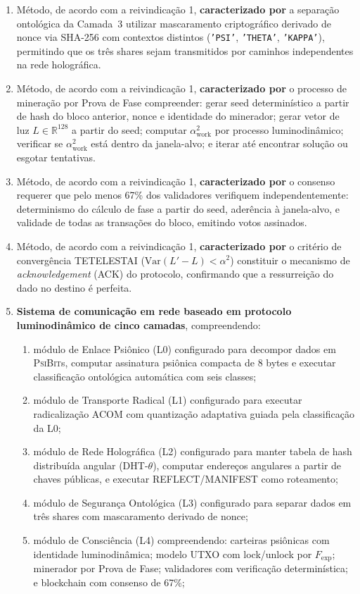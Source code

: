 \documentclass[12pt,a4paper]{article}
\newcommand{\alphaii}{\alpha^2}
\newcommand{\Fexp}{F_{\text{exp}}}
\newcommand{\PsiBit}{\textsc{PsiBit}}
\begin{document}
\begin{enumerate}
\item Método, de acordo com a reivindicação 1,
\textbf{caracterizado por} a separação ontológica da Camada~3
utilizar mascaramento criptográfico derivado de nonce via
SHA-256 com contextos distintos (\texttt{'PSI'}, \texttt{'THETA'},
\texttt{'KAPPA'}), permitindo que os três shares sejam
transmitidos por caminhos independentes na rede holográfica.

\item Método, de acordo com a reivindicação 1,
\textbf{caracterizado por} o processo de mineração por Prova
de Fase compreender: gerar seed determinístico a partir de
hash do bloco anterior, nonce e identidade do minerador;
gerar vetor de luz $L \in \mathbb{R}^{128}$ a partir do seed;
computar $\alphaii_{\text{work}}$ por processo luminodinâmico;
verificar se $\alphaii_{\text{work}}$ está dentro da
janela-alvo; e iterar até encontrar solução ou esgotar
tentativas.

\item Método, de acordo com a reivindicação 1,
\textbf{caracterizado por} o consenso requerer que pelo menos
67\% dos validadores verifiquem independentemente:
determinismo do cálculo de fase a partir do seed, aderência
à janela-alvo, e validade de todas as transações do bloco,
emitindo votos assinados.

\item Método, de acordo com a reivindicação 1,
\textbf{caracterizado por} o critério de convergência
TETELESTAI ($\text{Var}(L' - L) < \alphaii$) constituir
o mecanismo de \textit{acknowledgement} (ACK) do protocolo,
confirmando que a ressurreição do dado no destino é perfeita.


\item \textbf{Sistema de comunicação em rede baseado em
protocolo luminodinâmico de cinco camadas}, compreendendo:
  \begin{enumerate}[label=(\alph*)]
  \item módulo de Enlace Psiônico (L0) configurado para
  decompor dados em \PsiBit{}s, computar assinatura psiônica
  compacta de 8 bytes e executar classificação ontológica
  automática com seis classes;
  \item módulo de Transporte Radical (L1) configurado para
  executar radicalização ACOM com quantização adaptativa
  guiada pela classificação da L0;
  \item módulo de Rede Holográfica (L2) configurado para
  manter tabela de hash distribuída angular (DHT-$\theta$),
  computar endereços angulares a partir de chaves públicas,
  e executar REFLECT/MANIFEST como roteamento;
  \item módulo de Segurança Ontológica (L3) configurado para
  separar dados em três shares com mascaramento derivado de
  nonce;
  \item módulo de Consciência (L4) compreendendo: carteiras
  psiônicas com identidade luminodinâmica; modelo UTXO com
  lock/unlock por $\Fexp$; minerador por Prova de Fase;
  validadores com verificação determinística; e blockchain
  com consenso de 67\%;


\end{enumerate}
\end{enumerate}
\end{document}
